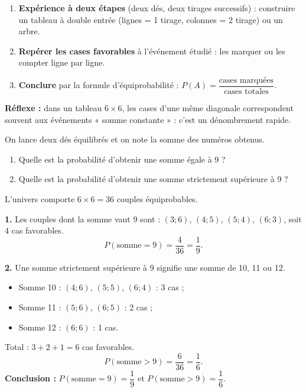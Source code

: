 \documentclass[11pt]{article}
\begin{document}
\begin{methode}
\begin{enumerate}
\item \textbf{Expérience à deux étapes} (deux dés, deux tirages successifs) : construire un tableau à double entrée (lignes = 1\ier{} tirage, colonnes = 2\ieme{} tirage) ou un arbre.
\item \textbf{Repérer les cases favorables} à l'événement étudié : les marquer ou les compter ligne par ligne.
\item \textbf{Conclure} par la formule d'équiprobabilité : $P(A) = \dfrac{\text{cases marquées}}{\text{cases totales}}$.
\end{enumerate}
\textbf{Réflexe :} dans un tableau $6 \times 6$, les cases d'une même diagonale correspondent souvent aux événements « somme constante » : c'est un dénombrement rapide.
\end{methode}

\begin{exoresolu}
On lance deux dés équilibrés et on note la somme des numéros obtenus.
\begin{enumerate}
\item Quelle est la probabilité d'obtenir une somme égale à 9 ?
\item Quelle est la probabilité d'obtenir une somme strictement supérieure à 9 ?
\end{enumerate}
\tcblower
L'univers comporte $6 \times 6 = 36$ couples équiprobables.

\textbf{1.} Les couples dont la somme vaut 9 sont : $(3;6)$, $(4;5)$, $(5;4)$, $(6;3)$, soit 4 cas favorables.
\[ P(\text{somme} = 9) = \frac{4}{36} = \frac{1}{9}. \]

\textbf{2.} Une somme strictement supérieure à 9 signifie une somme de 10, 11 ou 12.
\begin{itemize}
\item Somme 10 : $(4;6)$, $(5;5)$, $(6;4)$ : 3 cas ;
\item Somme 11 : $(5;6)$, $(6;5)$ : 2 cas ;
\item Somme 12 : $(6;6)$ : 1 cas.
\end{itemize}
Total : $3 + 2 + 1 = 6$ cas favorables.
\[ P(\text{somme} > 9) = \frac{6}{36} = \frac{1}{6}. \]
\textbf{Conclusion :} $P(\text{somme} = 9) = \dfrac{1}{9}$ et $P(\text{somme} > 9) = \dfrac{1}{6}$.
\end{exoresolu}
\end{document}
